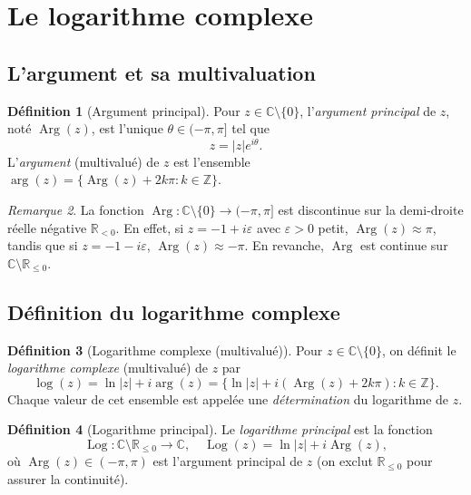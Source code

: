 \documentclass[12pt,a4paper,openany]{book}
\theoremstyle{definition}
\newtheorem{definition}{Définition}[chapter]
\theoremstyle{plain}
\theoremstyle{remark}
\newtheorem{remarque}[definition]{Remarque}
\newcommand{\C}{\mathbb{C}}
\newcommand{\R}{\mathbb{R}}
\newcommand{\Z}{\mathbb{Z}}
\DeclareMathOperator{\Arg}{Arg}
\DeclareMathOperator{\Log}{Log}
\newcommand{\abs}[1]{\left|#1\right|}
\begin{document}
\section{Le logarithme complexe}\label{sec:log}

\subsection{L'argument et sa multivaluation}

\begin{definition}[Argument principal]\label{def:arg-principal}
Pour $z \in \C \setminus \{0\}$, l'\emph{argument principal} de $z$, noté $\Arg(z)$,
est l'unique $\theta \in (-\pi, \pi]$ tel que
\[
  z = \abs{z} e^{i\theta}.
\]
L'\emph{argument} (multivalué) de $z$ est l'ensemble
$\arg(z) = \{\Arg(z) + 2k\pi : k \in \Z\}$.
\end{definition}

\begin{remarque}\label{rem:arg-discontinu}
La fonction $\Arg : \C \setminus \{0\} \to (-\pi,\pi]$ est discontinue sur la demi-droite réelle négative $\R_{<0}$. En effet, si $z = -1 + i\varepsilon$ avec $\varepsilon > 0$ petit, $\Arg(z) \approx \pi$, tandis que si $z = -1 - i\varepsilon$, $\Arg(z) \approx -\pi$. En revanche, $\Arg$ est continue sur $\C \setminus \R_{\leq 0}$.
\end{remarque}

\subsection{Définition du logarithme complexe}

\begin{definition}[Logarithme complexe (multivalué)]\label{def:log-multivalué}
Pour $z \in \C \setminus \{0\}$, on définit le \emph{logarithme complexe} (multivalué) de $z$ par
\[
  \log(z) = \ln\abs{z} + i\arg(z) = \{\ln\abs{z} + i(\Arg(z) + 2k\pi) : k \in \Z\}.
\]
Chaque valeur de cet ensemble est appelée une \emph{détermination} du logarithme de $z$.
\end{definition}

\begin{definition}[Logarithme principal]\label{def:log-principal}
Le \emph{logarithme principal} est la fonction
\[
  \Log : \C \setminus \R_{\leq 0} \longrightarrow \C, \quad
  \Log(z) = \ln\abs{z} + i\Arg(z),
\]
où $\Arg(z) \in (-\pi,\pi)$ est l'argument principal de $z$
(on exclut $\R_{\leq 0}$ pour assurer la continuité).
\end{definition}
\end{document}
